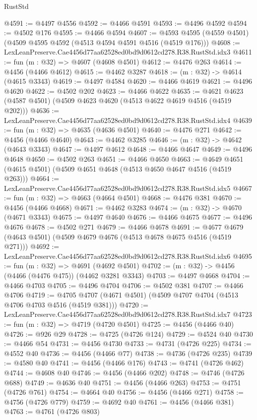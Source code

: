 \begin{lexlean}{RustStd}
\begin{coremodule}
@4591 := @4497 @4556
@4592 := @4466 @4591
@4593 := @4496 @4592
@4594 := @4502 @176
@4595 := @4466 @4594
@4607 := @4593 @4595 (@4559 @4501) (@4509 @4595 @4592 (@4513 @4594 @4591 @4516 (@4519 @176)))
@4608 := LexLeanPreserve.Cae4456d77aa62528ed0bd9d0612cd278.R38.RustStd.idx3
@4611 := fun (m : @32) => @4607 (@4608 @4501)
@4612 := @4476 @263
@4614 := @4456 (@4466 @4612)
@4615 := @4462 @3287
@4618 := (m : @32) -> @4614 (@4615 @3343)
@4619 := @4497 @4584
@4620 := @4466 @4619
@4621 := @4496 @4620
@4622 := @4502 @202
@4623 := @4466 @4622
@4635 := @4621 @4623 (@4587 @4501) (@4509 @4623 @4620 (@4513 @4622 @4619 @4516 (@4519 @202)))
@4636 := LexLeanPreserve.Cae4456d77aa62528ed0bd9d0612cd278.R38.RustStd.idx4
@4639 := fun (m : @32) => @4635 (@4636 @4501)
@4640 := @4476 @271
@4642 := @4456 (@4466 @4640)
@4643 := @4462 @3285
@4646 := (m : @32) -> @4642 (@4643 @3343)
@4647 := @4497 @4612
@4648 := @4466 @4647
@4649 := @4496 @4648
@4650 := @4502 @263
@4651 := @4466 @4650
@4663 := @4649 @4651 (@4615 @4501) (@4509 @4651 @4648 (@4513 @4650 @4647 @4516 (@4519 @263)))
@4664 := LexLeanPreserve.Cae4456d77aa62528ed0bd9d0612cd278.R38.RustStd.idx5
@4667 := fun (m : @32) => @4663 (@4664 @4501)
@4668 := @4476 @381
@4670 := @4456 (@4466 @4668)
@4671 := @4462 @3283
@4674 := (m : @32) -> @4670 (@4671 @3343)
@4675 := @4497 @4640
@4676 := @4466 @4675
@4677 := @4496 @4676
@4678 := @4502 @271
@4679 := @4466 @4678
@4691 := @4677 @4679 (@4643 @4501) (@4509 @4679 @4676 (@4513 @4678 @4675 @4516 (@4519 @271)))
@4692 := LexLeanPreserve.Cae4456d77aa62528ed0bd9d0612cd278.R38.RustStd.idx6
@4695 := fun (m : @32) => @4691 (@4692 @4501)
@4702 := (m : @32) -> @4456 (@4466 (@4476 @475)) (@4462 @3281 @3343)
@4703 := @4497 @4668
@4704 := @4466 @4703
@4705 := @4496 @4704
@4706 := @4502 @381
@4707 := @4466 @4706
@4719 := @4705 @4707 (@4671 @4501) (@4509 @4707 @4704 (@4513 @4706 @4703 @4516 (@4519 @381)))
@4720 := LexLeanPreserve.Cae4456d77aa62528ed0bd9d0612cd278.R38.RustStd.idx7
@4723 := fun (m : @32) => @4719 (@4720 @4501)
@4725 := @4456 (@4466 @40)
@4726 := @926 @29
@4728 := @4725 (@4726 @124)
@4729 := @4524 @40
@4730 := @4466 @54
@4731 := @4456 @4730
@4733 := @4731 (@4726 @225)
@4734 := @4552 @40
@4736 := @4456 (@4466 @77)
@4738 := @4736 (@4726 @235)
@4739 := @4580 @40
@4741 := @4456 (@4466 @176)
@4743 := @4741 (@4726 @462)
@4744 := @4608 @40
@4746 := @4456 (@4466 @202)
@4748 := @4746 (@4726 @688)
@4749 := @4636 @40
@4751 := @4456 (@4466 @263)
@4753 := @4751 (@4726 @761)
@4754 := @4664 @40
@4756 := @4456 (@4466 @271)
@4758 := @4756 (@4726 @779)
@4759 := @4692 @40
@4761 := @4456 (@4466 @381)
@4763 := @4761 (@4726 @803)

\end{coremodule}
\end{lexlean}
